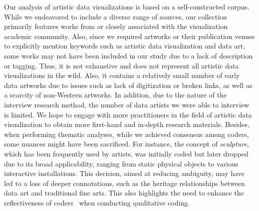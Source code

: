 Our analysis of artistic data visualizations is based on a self-constructed corpus. While we endeavored to include a diverse range of sources, our collection primarily features works from or closely associated with the visualization academic community. 
Also, since we required artworks or their publication venues to explicitly mention keywords such as artistic data visualization and data art, some works may not have been included in our study due to a lack of description or tagging.
Thus, it is not exhaustive and does not represent all artistic data visualizations in the wild. Also, it contains a relatively small number of early data artworks due to issues such as lack of digitization or broken links, as well as a scarcity of non-Western artworks. 
In addition, due to the nature of the interview research method, the number of data artists we were able to interview is limited. %
We hope to engage with more practitioners in the field of artistic data visualization to obtain more first-hand and in-depth research materials. 
Besides, when performing thematic analyses, while we achieved consensus among coders, some nuances might have been sacrificed. For instance, the concept of \textit{sculpture}, which has been frequently used by artists, was initially coded but later dropped due to its broad applicability, ranging from static physical objects to various interactive installations. This decision, aimed at reducing ambiguity, may have led to a loss of deeper connotations, such as the heritage relationships between data art and traditional fine arts. This also highlights the need to enhance the reflectiveness of coders~\cite{braun2022thematic} when conducting qualitative coding.

